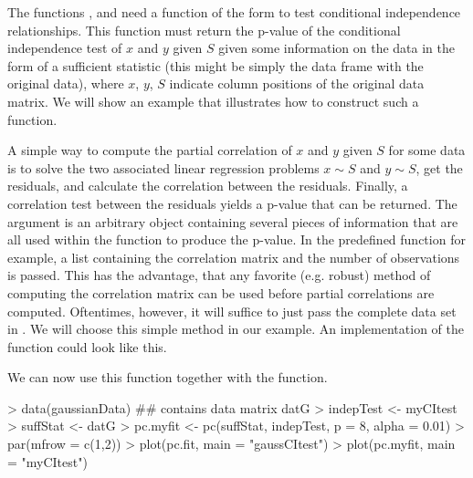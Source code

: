 \documentclass[article]{jss}
\begin{document}
The functions ,  and  need a
  function of the form  to test
  conditional independence relationships. This function must return
  the p-value of the conditional independence test of $x$ and $y$ given
  $S$ given some information on the data in the form of a sufficient
  statistic (this might be simply the data frame with the original
  data), where $x$, $y$, $S$ indicate column positions of the original data
  matrix. We will show an example that illustrates how to construct such a
  function.

A simple way to compute the partial correlation of $x$ and $y$ given $S$
for some data is to solve the two associated linear regression problems $x
\sim S$ and $y \sim S$, get the residuals, and calculate the correlation
between the residuals. Finally, a correlation test between the residuals
yields a p-value that can be returned. The argument  is an
arbitrary object containing several pieces of information that are all used
within the function to produce the p-value. In the predefined function
 for example, a list containing the correlation matrix
and the number of observations is passed. This has the advantage, that any
favorite (e.g. robust) method of computing the correlation matrix can be
used before partial correlations are computed. Oftentimes, however, it will
suffice to just pass the complete data set in . We will
choose this simple method in our example. An implementation of the function
 could look like this.
\begin{Schunk}
\end{Schunk}
We can now use this function together with the  function.

\begin{Schunk}
\begin{Sinput}
> data(gaussianData) ## contains data matrix datG
> indepTest <- myCItest 
> suffStat <- datG
> pc.myfit <- pc(suffStat, indepTest, p = 8, alpha = 0.01)
> par(mfrow = c(1,2))
> plot(pc.fit, main = "gaussCItest")
> plot(pc.myfit, main = "myCItest")
\end{Sinput}
\end{Schunk}
\end{document}
